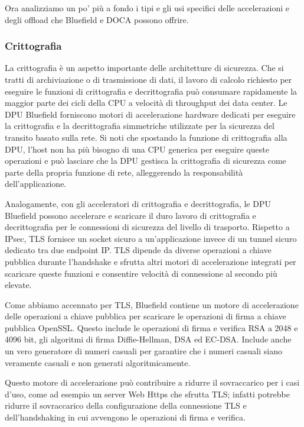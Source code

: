 \documentclass[binding=0.6cm]{sapthesis}
\theoremstyle{definition}
\begin{document}
Ora analizziamo un po' più a fondo i tipi e gli usi specifici delle accelerazioni e degli offload che Bluefield e DOCA possono offrire. 

\subsubsection{Crittografia}

La crittografia è un aspetto importante delle architetture di sicurezza. Che si tratti di archiviazione o di trasmissione di dati, il lavoro di calcolo richiesto per eseguire le funzioni di crittografia e decrittografia può consumare rapidamente la maggior parte dei cicli della CPU a velocità di throughput dei data center.
Le DPU Bluefield forniscono motori di accelerazione hardware dedicati per eseguire la crittografia e la decrittografia simmetriche utilizzate per la sicurezza del transito basato sulla rete. 
Si noti che spostando la funzione di crittografia alla DPU, l'host non ha più bisogno di una CPU generica per eseguire queste operazioni e può lasciare che la DPU gestisca la crittografia di sicurezza come parte della propria funzione di rete, alleggerendo la responsabilità dell'applicazione.

Analogamente, con gli acceleratori di crittografia e decrittografia, le DPU Bluefield possono accelerare e scaricare il duro lavoro di crittografia e decrittografia per le connessioni di sicurezza del livello di trasporto. 
Rispetto a IPsec, TLS fornisce un socket sicuro a un'applicazione invece di un tunnel sicuro dedicato tra due endpoint IP. 
TLS dipende da diverse operazioni a chiave pubblica durante l'handshake e sfrutta altri motori di accelerazione integrati per scaricare queste funzioni e consentire velocità di connessione al secondo più elevate.

Come abbiamo accennato per TLS, Bluefield contiene un motore di accelerazione delle operazioni a chiave pubblica per scaricare le operazioni di firma a chiave pubblica OpenSSL. 
Questo include le operazioni di firma e verifica RSA a 2048 e 4096 bit, gli algoritmi di 
firma Diffie-Hellman, DSA ed EC-DSA. Include anche un vero generatore di numeri casuali per 
garantire che i numeri casuali siano veramente casuali e non generati algoritmicamente.


Questo motore di accelerazione può contribuire a ridurre il sovraccarico per i casi d'uso, 
come ad esempio un server Web Https che sfrutta TLS; infatti potrebbe ridurre il sovraccarico della
configurazione della connessione TLS e dell'handshaking in cui avvengono le operazioni 
di firma e verifica.
\end{document}
